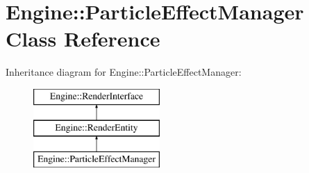 \hypertarget{classEngine_1_1ParticleEffectManager}{}\section{Engine\+:\+:Particle\+Effect\+Manager Class Reference}
\label{classEngine_1_1ParticleEffectManager}
Inheritance diagram for Engine\+:\+:Particle\+Effect\+Manager\+:\begin{figure}[H]
\begin{center}
\leavevmode
\includegraphics[height=3.000000cm]{classEngine_1_1ParticleEffectManager}
\end{center}
\end{figure}
